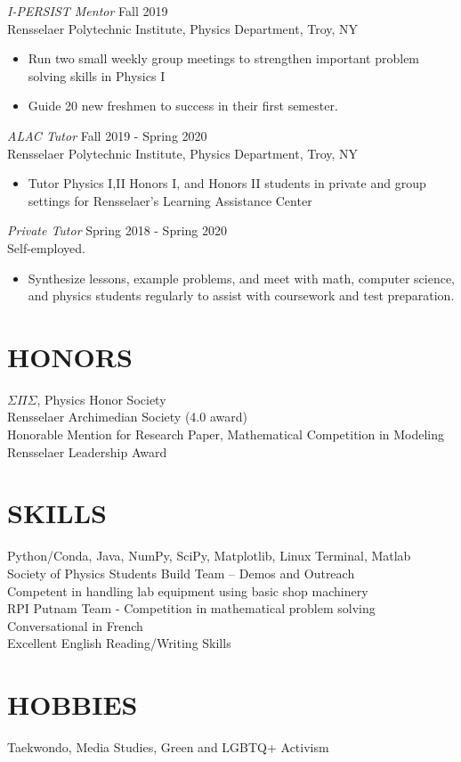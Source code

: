 \documentclass[margin]{rpires}
\begin{document}
\begin{resume}
    {\sl I-PERSIST Mentor} \hfill Fall 2019 \\
    Rensselaer Polytechnic Institute, Physics Department, Troy, NY
    \begin{itemize}  \itemsep -2pt %
        \item Run two small weekly group meetings to strengthen important problem solving skills in Physics I 
        \item Guide 20 new freshmen to success in their first semester.
    \end{itemize}

    {\sl ALAC Tutor} \hfill Fall 2019 - Spring 2020 \\
    Rensselaer Polytechnic Institute, Physics Department, Troy, NY
    \begin{itemize}  \itemsep -2pt %
        \item Tutor Physics I,II Honors I, and Honors II students in private and group settings for Rensselaer's Learning Assistance Center
    \end{itemize}

    {\sl Private Tutor} \hfill Spring 2018 - Spring 2020 \\
    Self-employed.
    \begin{itemize}  \itemsep -2pt %
        \item Synthesize lessons, example problems, and meet with math, computer science, and physics students regularly to assist with coursework and test preparation.
    \end{itemize}
    
    
\section{HONORS} $\Sigma \Pi \Sigma$, Physics Honor Society \\
                 Rensselaer Archimedian Society (4.0 award) \\
                 Honorable Mention for Research Paper, Mathematical Competition in Modeling \\
                 Rensselaer Leadership Award 
 
\section{SKILLS}
Python/Conda, Java, NumPy, SciPy, Matplotlib, Linux Terminal, Matlab\\
Society of Physics Students Build Team – Demos and Outreach \\
Competent in handling lab equipment using basic shop machinery\\
RPI Putnam Team - Competition in mathematical problem solving\\
Conversational in French\\
Excellent English Reading/Writing Skills \\

 
\section{HOBBIES}         Taekwondo, Media Studies, Green and LGBTQ+ Activism
 
\end{resume} 
\end{document}
